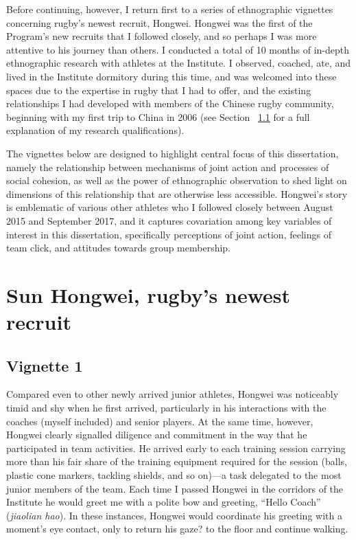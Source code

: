 Before continuing, however, I return first to a series of ethnographic vignettes concerning rugby's newest recruit, Hongwei. Hongwei was the first of the Program’s new recruits that I followed closely, and so perhaps I was more attentive to his journey than others.  I conducted a total of 10 months of in-depth ethnographic research with athletes at the Institute.  I observed, coached, ate, and lived in the Institute dormitory during this time, and was welcomed into these spaces due to the expertise in rugby that I had to offer, and the existing relationships I had developed with members of the Chinese rugby community, beginning with my first trip to China in 2006 (see Section ~\ref{} for a full explanation of my research qualifications).

The vignettes below are designed to highlight central focus of this dissertation, namely the relationship between mechanisms of joint action and processes of social cohesion, as well as the power of ethnographic observation to shed light on dimensions of this relationship that are otherwise less accessible.  Hongwei's story is emblematic of various other athletes who I followed closely between August 2015 and September 2017, and it captures covariation among key variables of interest in this dissertation, specifically perceptions of joint action, feelings of team click, and attitudes towards group membership.

\section{Sun Hongwei, rugby's newest recruit}

\subsection{Vignette 1}
Compared even to other newly arrived junior athletes, Hongwei was noticeably timid and shy when he first arrived, particularly in his interactions with the coaches (myself included) and senior players.   At the same time, however, Hongwei clearly signalled diligence and commitment in the way that he participated in team activities.  He arrived early to each training session carrying more than his fair share of the training equipment required for the session (balls, plastic cone markers, tackling shields, and so on)---a task delegated to the most junior members of the team.  Each time I passed Hongwei in the corridors of the Institute he would greet me with a polite bow and greeting, ``Hello Coach'' (\textit{jiaolian hao}).  In these instances, Hongwei would coordinate his greeting with a moment's eye contact, only to return his gaze? to the floor and continue walking.


